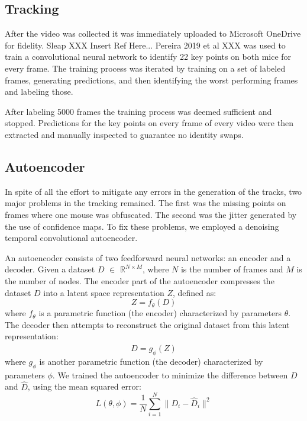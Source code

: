 \documentclass[12pt,english]{article}
\begin{document}
\subsection{Tracking}



After the video was collected it was immediately uploaded to Microsoft OneDrive for fidelity. Sleap XXX Insert Ref Here... Pereira 2019 et al XXX was used to train a convolutional neural network to identify 22 key points on both mice for every frame. The training process was iterated by training on a set of labeled frames, generating predictions, and then identifying the worst performing frames and labeling those. 


After labeling 5000 frames the training process was deemed sufficient and stopped. Predictions for the key points on every frame of every video were then extracted and manually inspected to guarantee no identity swaps. 



\subsection{Autoencoder}

In spite of all the effort to mitigate any errors in the generation of the tracks, two major problems in the tracking remained. The first was the missing points on frames where one mouse was obfuscated. The second was the jitter generated by the use of confidence maps. To fix these problems, we employed a denoising temporal convolutional autoencoder.

An autoencoder consists of two feedforward neural networks: an encoder and a decoder. Given a dataset \( D \) $\in$ \( \mathbb{R}^{N \times M} \), where \( N \) is the number of frames and \( M \) is the number of nodes. The encoder part of the autoencoder compresses the dataset \( D \) into a latent space representation \( Z \), defined as:
\[ Z = f_\theta(D) \]
where \( f_\theta \) is a parametric function (the encoder) characterized by parameters \( \theta \). The decoder then attempts to reconstruct the original dataset from this latent representation:
\[ \hat{D} = g_\phi(Z) \]
where \( g_\phi \) is another parametric function (the decoder) characterized by parameters \( \phi \). We trained the autoencoder to minimize the difference between \( D \) and \( \hat{D} \), using the mean squared error:
\[ L(\theta, \phi) = \frac{1}{N} \sum_{i=1}^{N} \|D_i - \hat{D}_i\|^2 \]
\end{document}
